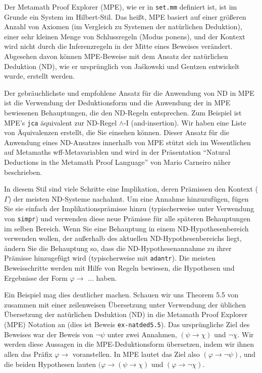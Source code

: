 Der Metamath Proof Explorer (MPE), wie er in \texttt{set.mm} definiert ist, ist im Grunde ein System im Hilbert-Stil. Das heißt, MPE basiert auf einer größeren Anzahl von Axiomen (im Vergleich zu Systemen der natürlichen Deduktion), einer sehr kleinen Menge von Schlussregeln (Modus ponens), und der Kontext wird nicht durch die Inferenzregeln in der Mitte eines Beweises verändert. Abgesehen davon können MPE-Beweise mit dem Ansatz der natürlichen Deduktion (ND), wie er ursprünglich von Ja\'skowski und Gentzen entwickelt wurde, erstellt werden.

Der gebräuchlichste und empfohlene Ansatz für die Anwendung von ND in MPE ist die Verwendung der Deduktionsform %
 und die Anwendung der in MPE bewiesenen Behauptungen, die den ND-Regeln entsprechen. Zum Beispiel ist MPE's \texttt{jca} äquivalent zur ND-Regel $\land$-I (and-insertion). Wir haben eine Liste von Äquivalenzen erstellt, die Sie einsehen können. Dieser Ansatz für die Anwendung eines ND-Ansatzes innerhalb von MPE stützt sich im Wesentlichen auf Metamaths wff-Metavariablen und wird in der Präsentation "`Natural Deductions in the Metamath Proof Language"' von Mario Carneiro \cite{CarneiroND} näher beschrieben.

In diesem Stil sind viele Schritte eine Implikation, deren Prämissen den Kontext ($\Gamma$) der meisten ND-Systeme nachahmt. Um eine Annahme hinzuzufügen, fügen Sie sie einfach der Implikationsprämisse hinzu (typischerweise unter Verwendung von \texttt{simpr}) und verwenden diese neue Prämisse für alle späteren Behauptungen im selben Bereich. Wenn Sie eine Behauptung in einem ND-Hypothesenbereich verwenden wollen, der außerhalb des aktuellen ND-Hypothesenbereichs liegt, ändern Sie die Behauptung so, dass die ND-Hypothesenannahme zu ihrer Prämisse hinzugefügt wird (typischerweise mit \texttt{adantr}). Die meisten Beweisschritte werden mit Hilfe von Regeln bewiesen, die Hypothesen und Ergebnisse der Form $\varphi \rightarrow$ ... haben.

Ein Beispiel mag dies deutlicher machen. Schauen wir uns Theorem 5.5 von \cite[S.~18]{Clemente} zusammen mit einer zeilenweisen Übersetzung unter Verwendung der üblichen Übersetzung der natürlichen Deduktion (ND) in die Metamath Proof Explorer (MPE) Notation an (dies ist Beweis \texttt{ex-natded5.5}). Das ursprüngliche Ziel des Beweises war der Beweis von $ \lnot \psi$ unter zwei Annahmen, $( \psi \rightarrow \chi )$ und $ \lnot \chi$. Wir werden diese Aussagen in die MPE-Deduktionsform übersetzen, indem wir ihnen allen das Präfix $\varphi \rightarrow$ voranstellen. In MPE lautet das Ziel also $( \varphi \rightarrow \lnot \psi )$, und die beiden Hypothesen lauten $( \varphi \rightarrow ( \psi \rightarrow \chi )$ und $( \varphi \rightarrow \lnot \chi )$.

